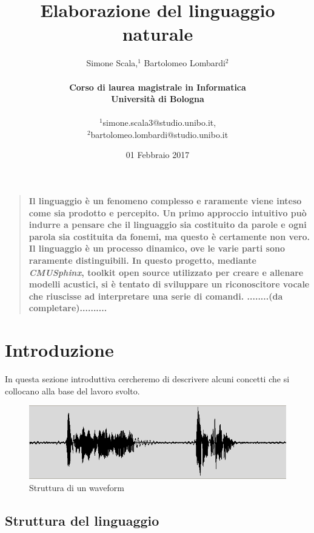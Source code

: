 \documentclass[12pt]{article}
\title{Elaborazione del linguaggio naturale}
\author{Simone Scala,$^{1}$ Bartolomeo Lombardi$^{2}$\\
    \\
    \textbf{Corso di laurea magistrale in Informatica} \\
    \textbf{Università di Bologna}
    \\\\
    \normalsize{$^{1}$simone.scala3@studio.unibo.it,}\\
    \normalsize{$^{2}$bartolomeo.lombardi@studio.unibo.it}\\
}
\date{01 Febbraio 2017}
\newenvironment{sciabstract}{%
\begin{quote} \bf}
{\end{quote}}
\begin{document}
 


\baselineskip 24pt

\maketitle 

\begin{sciabstract}
  Il linguaggio è un fenomeno complesso e raramente viene inteso come sia prodotto e percepito. Un primo approccio intuitivo può indurre a pensare che il linguaggio sia costituito da parole e ogni parola sia costituita da fonemi, ma questo è certamente non vero. Il linguaggio è un processo dinamico, ove le varie parti sono raramente distinguibili. In questo progetto,  mediante \textit{CMUSphinx}, toolkit open source utilizzato per creare e allenare modelli acustici, si è tentato di sviluppare un riconoscitore vocale che riuscisse ad interpretare una serie di comandi. ........(da completare)..........
\end{sciabstract}

\newpage
\tableofcontents
\newpage

\section{Introduzione}
    In questa sezione introduttiva cercheremo di descrivere alcuni concetti che si collocano alla base del lavoro svolto.
    
    \begin{figure}
            \centering
            \includegraphics[scale=0.5]{waveform}
            \caption{Struttura di un waveform}
            \label{fig:first}
     \end{figure}

    \subsection{Struttura del linguaggio}
    
\end{document}
